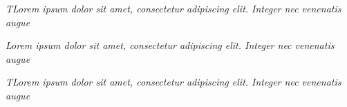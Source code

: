 \newpage \vspace*{8cm}
\thispagestyle{empty}

\begin{flushright}
   \emph{TLorem ipsum dolor sit amet, consectetur adipiscing elit. Integer nec venenatis augue}
\end{flushright}

\begin{flushright}
   \emph{Lorem ipsum dolor sit amet, consectetur adipiscing elit. Integer nec venenatis augue}
\end{flushright}

\begin{flushright}
   \emph{TLorem ipsum dolor sit amet, consectetur adipiscing elit. Integer nec venenatis augue}
\end{flushright}
 
